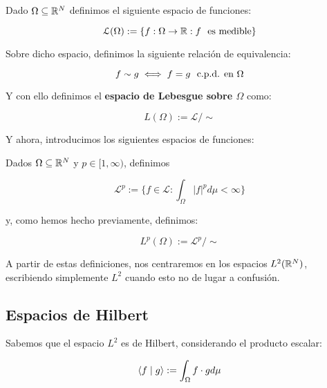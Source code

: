 \begin{definicion}

	Dado $\Omega \subseteq \mathbb{R}^N$ definimos el siguiente espacio de funciones:

	\begin{equation}
		\mathcal{L}(\Omega) := \{f: \Omega \to \mathbb{R} : f \ \  \text{es medible} \}
	\end{equation}

	Sobre dicho espacio, definimos la siguiente relación de equivalencia:

	\begin{equation}
		f \sim g \iff f = g \ \  \text{c.p.d. en } \Omega
	\end{equation}

	Y con ello definimos el \textbf{espacio de Lebesgue sobre $\Omega$} como:

	\begin{equation}
		L(\Omega) := \mathcal{L} / \sim
	\end{equation}
\end{definicion}

Y ahora, introducimos los siguientes espacios de funciones:

\begin{definicion}
	Dados $\Omega \subseteq \mathbb{R}^N$ y $p \in [1, \infty)$, definimos

	\begin{equation}
		\mathcal{L}^p := \{ f \in \mathcal{L} : \int_{\Omega} |f|^p d\mu < \infty \}
	\end{equation}

	y, como hemos hecho previamente, definimos:

	\begin{equation}
		L^p(\Omega) := \mathcal{L}^p / \sim
	\end{equation}

\end{definicion}

A partir de estas definiciones, nos centraremos en los espacios $L^2(\mathbb{R}^N)$, escribiendo simplemente $L^2$ cuando esto no de lugar a confusión.

\subsection{Espacios de Hilbert}

Sabemos que el espacio $L^2$ es de Hilbert, considerando el producto escalar:

\begin{equation}
	\langle f \; | \; g \rangle := \int_{\Omega} f \cdot g d\mu
\end{equation}

